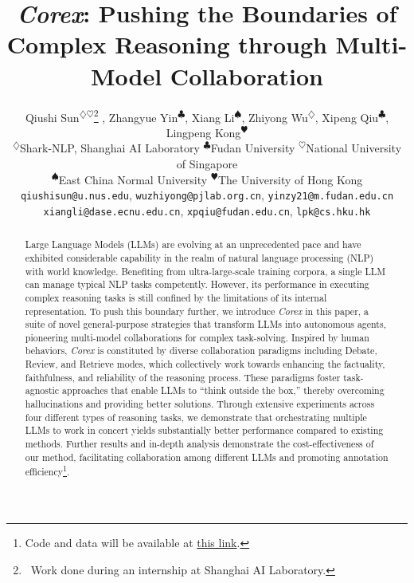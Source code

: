 \documentclass{article}
\title{\textsl{Corex}: Pushing the Boundaries of Complex Reasoning through Multi-Model Collaboration}
\author{Qiushi Sun\textsuperscript{$\diamondsuit\heartsuit$}\thanks{\, Work done during an internship at Shanghai AI Laboratory.} , Zhangyue Yin\textsuperscript{$\clubsuit$}, Xiang Li\textsuperscript{$\spadesuit$}, Zhiyong Wu\textsuperscript{$\diamondsuit$}, Xipeng Qiu\textsuperscript{$\clubsuit$}, Lingpeng Kong\textsuperscript{$\varheartsuit$}\\
\textsuperscript{$\diamondsuit$}Shark-NLP, Shanghai AI Laboratory
\textsuperscript{$\clubsuit$}Fudan University 
\textsuperscript{$\heartsuit$}National University of Singapore \quad \\
\textsuperscript{$\spadesuit$}East China Normal University 
\textsuperscript{$\varheartsuit$}The University of Hong Kong \\
\texttt{qiushisun@u.nus.edu},
\texttt{wuzhiyong@pjlab.org.cn}, \texttt{yinzy21@m.fudan.edu.cn} \\
\texttt{xiangli@dase.ecnu.edu.cn}, \texttt{xpqiu@fudan.edu.cn}, \texttt{lpk@cs.hku.hk}
}
\begin{document}
\newcommand{\ours}{\textsl{Corex}\xspace}
\newcommand{\crraw}{\textsl{Corex}\xspace}
\newcommand{\crd}{\textsl{Corex-Debate}\xspace}
\newcommand{\crcode}{\textsl{Corex-Review\textsubscript{Code}}\xspace}
\newcommand{\crnl}{\textsl{Corex-Review\textsubscript{NL}}\xspace}
\newcommand{\rcode}{\textsl{Review\textsubscript{Code}}\xspace}
\newcommand{\rnl}{\textsl{Review\textsubscript{NL}}\xspace}
\newcommand{\crrt}{\textsl{Corex-Retrieve}\xspace}
\newcommand{\turbon}{\texttt{GPT-3.5-Turbo}\xspace}
\newcommand{\turbo}{\texttt{GPT-3.5-Turbo-0613}\xspace}
\newcommand{\turbol}{\texttt{GPT-3.5-Turbo-16k}\xspace}
\newcommand{\gpt}{\texttt{GPT-4-0613}\xspace}
\newcommand{\claude}{\texttt{Claude-Instant-1.2}\xspace}
\newcommand{\codex}{\texttt{Code-davinci-002}\xspace}

\newcommand{\lpk}[1]{\textcolor{blue}{\bf \small [#1 --lpk]}}

\maketitle

\vspace{-1em}

\begin{abstract}

Large Language Models (LLMs) are evolving at an unprecedented pace and have exhibited considerable capability in the realm of natural language processing (NLP) with world knowledge. 
Benefiting from ultra-large-scale training corpora, 
a single LLM can manage typical NLP tasks competently. 
However, its performance in executing complex reasoning tasks is still confined by the limitations of its internal representation.
To push this boundary further,
we introduce \ours in this paper, 
a suite of novel general-purpose strategies that transform LLMs into autonomous agents,
pioneering multi-model collaborations for complex task-solving.
Inspired by human behaviors, 
\ours is constituted by diverse collaboration paradigms including Debate, Review, and Retrieve modes, 
which collectively work towards enhancing the factuality, faithfulness, and reliability of the reasoning process.
These paradigms foster task-agnostic approaches that enable LLMs to ``think outside the box,''
thereby overcoming hallucinations and providing better solutions.
Through extensive experiments across four different types of reasoning tasks, 
we demonstrate that orchestrating multiple LLMs to work in concert yields substantially better performance compared to existing methods.
Further results and in-depth analysis demonstrate the cost-effectiveness of our method, 
facilitating collaboration among different LLMs and promoting annotation efficiency\footnote{Code and data will be available at \href{https://github.com/QiushiSun/Corex}{this link}.}.


\end{abstract}
\end{document}
